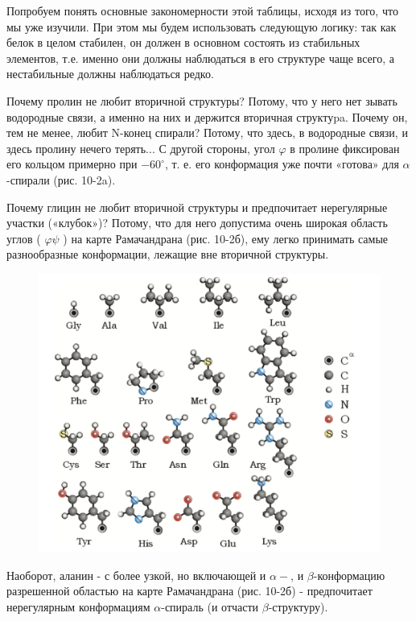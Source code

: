 \documentclass[
11pt,%
tightenlines,%
twoside,%
onecolumn,%
nofloats,%
nobibnotes,%
nofootinbib,%
superscriptaddress,%
noshowpacs,%
centertags]%
{revtex4}
\begin{document}
Попробуем понять основные закономерности этой таблицы, исходя из того, что мы уже изучили. При этом мы будем использовать следующую логику: так как белок в целом стабилен, он должен в основном состоять из стабильных элементов, т.е. именно они должны наблюдаться в его структуре чаще всего, а нестабильные должны наблюдаться редко.

Почему пролин не любит вторичной структуры? Потому, что у него нет зывать водородные связи, а именно на них и держится вторичная структуpa. Почему он, тем не менее, любит N-конец спирали? Потому, что здесь, в водородные связи, и здесь пролину нечего терять... С другой стороны, угол $\varphi$ в пролине фиксирован его кольцом примерно при $-60^{\circ}$, т. е. его конформация уже почти «готова» для $\alpha$-спирали (рис. 10-2a).


Почему глицин не любит вторичной структуры и предпочитает нерегулярные участки («клубок»)? Потому, что для него допустима очень широкая область углов ( $\varphi \psi$ ) на карте Рамачандрана (рис. 10-2б), ему легко принимать самые разнообразные конформации, лежащие вне вторичной структуры.

\begin{figure}
	\centering
	\includegraphics[scale=0.3]{amin}
	\caption{}
\end{figure}
Наоборот, аланин - с более узкой, но включающей и $\alpha-$, и $\beta$-конформацию разрешенной областью на карте Рамачандрана (рис. 10-2б) - предпочитает нерегулярным конформациям $\alpha$-спираль (и отчасти $\beta$-структуру).
\end{document}

